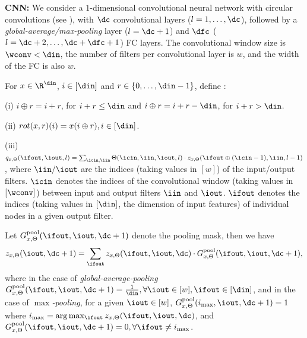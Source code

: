 \textbf{CNN:} We consider a $1$-dimensional convolutional neural network with circular convolutions (see ), with $\dc$ convolutional layers ($l=1,\ldots,\dc$), followed by a \emph{global-average/max-pooling} layer ($l=\dc+1$) and $\dfc$ ($l=\dc+2,\ldots,\dc+\dfc+1$) FC  layers. The convolutional window size is $\wconv<\din$, the number of filters per convolutional layer is $w$, and the width of the FC is also $w$. 
\begin{definition}
For $x\in\R^{\din}$, $i\in[\din]$ and $r\in\{0,\ldots,\din-1\}$, define :

(i) $i\oplus r = i+r$, for $i+r \leq \din$ and $i\oplus r =i+r-\din$, for $i+r>\din$.

(ii) $rot(x,r)(i)=x(i\oplus r), i\in[\din]$.

(iii) $q_{x,\Theta}(\ifout,\iout,l)=\sum_{\icin,\iin}\Theta(\icin,\iin,\iout,l)\cdot z_{x,\Theta}(\ifout\oplus (\icin-1),\iin,l-1)$, where $\iin/\iout$ are the indices (taking values in $[w]$) of the input/output filters. $\icin$ denotes the indices of the convolutional window (taking values in $[\wconv]$) between input and output filters $\iin$ and $\iout$. $\ifout$ denotes the indices (taking values in $[\din]$, the dimension of input features) of individual nodes in a given output filter.
\end{definition}
\begin{definition}[Pooling]
Let $G^{\text{pool}}_{x,\Theta}(\ifout,\iout,\dc+1)$ denote the pooling mask, then we have
\begin{align*}
z_{x,\Theta}(\iout, \dc+1) =\sum_{\ifout} z_{x,\Theta}(\ifout,\iout,\dc)\cdot G^{\text{pool}}_{x,\Theta}(\ifout,\iout,\dc+1),
\end{align*}
where in the case of \emph{global-average-pooling} $G^{\text{pool}}_{x,\Theta}(\ifout,\iout,\dc+1)=\frac{1}{\din},\forall \iout\in[w], \ifout\in[\din]$, and in the case of \emph{$\max$-pooling},  
for a given $\iout\in[w]$, $G^{\text{pool}}_{x,\Theta}(i_{\max},\iout,\dc+1)=1$ where $i_{\max}=\arg\max_{\ifout}z_{x,\Theta}(\ifout,\iout,\dc)$, and $G^{\text{pool}}_{x,\Theta}(\ifout,\iout,\dc+1)=0,\forall \ifout\neq i_{\max}$.
\end{definition}

